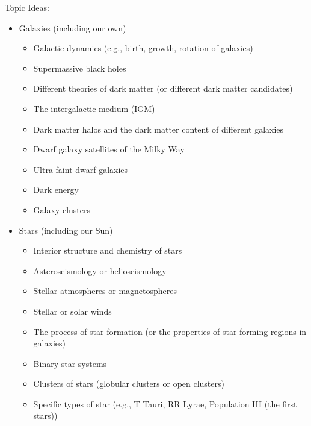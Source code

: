 \documentclass[11pt]{article}
\begin{document}
\medskip \noindent
Topic Ideas:
\begin{itemize}[noitemsep]
    \item Galaxies (including our own)
        \begin{itemize}[noitemsep]
            \item Galactic dynamics (e.g., birth, growth, rotation of galaxies)
            \item Supermassive black holes
            \item Different theories of dark matter (or different dark matter candidates)
            \item The intergalactic medium (IGM)
            \item Dark matter halos and the dark matter content of different galaxies
            \item Dwarf galaxy satellites of the Milky Way
            \item Ultra-faint dwarf galaxies
            \item Dark energy
            \item Galaxy clusters
        \end{itemize}

    \item Stars (including our Sun)
        \begin{itemize}[noitemsep]
            \item Interior structure and chemistry of stars
            \item Asteroseismology or helioseismology 
            \item Stellar atmospheres or magnetospheres
            \item Stellar or solar winds
            \item The process of star formation (or the properties of star-forming regions in galaxies)
            \item Binary star systems
            \item Clusters of stars (globular clusters or open clusters)
            \item Specific types of star (e.g., T Tauri, RR Lyrae, Population III (the first stars))
        \end{itemize}


\end{itemize}
\end{document}
